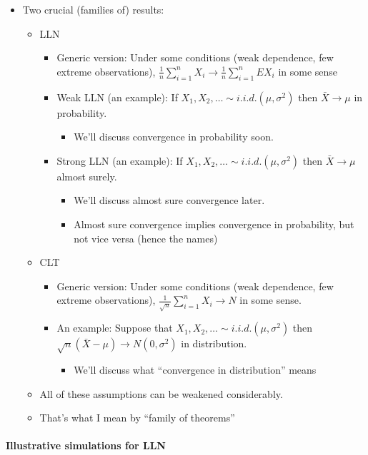 \begin{itemize}
\item Two crucial (families of) results:
\begin{itemize}
\item LLN
\begin{itemize}
\item Generic version: Under some conditions (weak dependence, few
           extreme observations), 
           $\frac{1}{n} \sum_{i=1}^n X_i \to \frac{1}{n} \sum_{i=1}^n E X_i$
           in some sense
\item Weak LLN (an example): If $X_1,X_2,\dots \sim i.i.d. (\mu,
           \sigma^2)$ then $\bar X \to \mu$ in probability.
\begin{itemize}
\item We'll discuss convergence in probability soon.
\end{itemize}
\item Strong LLN (an example): If $X_1,X_2,\dots \sim i.i.d. (\mu,
           \sigma^2)$ then $\bar X \to \mu$ almost surely.
\begin{itemize}
\item We'll discuss almost sure convergence later.
\item Almost sure convergence implies convergence in
             probability, but not vice versa (hence the names)
\end{itemize}
\end{itemize}
\item CLT
\begin{itemize}
\item Generic version: Under some conditions (weak dependence, few
           extreme observations), $\frac{1}{\sqrt{n}} \sum_{i=1}^n X_i
           \to N$ in some sense.
\item An example: Suppose that $X_1, X_2, \dots \sim i.i.d. (\mu, \sigma^2)$
           then $\sqrt{n}(\bar X - \mu) \to N(0, \sigma^2)$ in distribution.
\begin{itemize}
\item We'll discuss what ``convergence in distribution'' means
\end{itemize}
\end{itemize}
\item All of these assumptions can be weakened considerably.
\item That's what I mean by ``family of theorems''
\end{itemize}
\end{itemize}
\paragraph{Illustrative simulations for LLN}
\label{sec-1-1-2}


